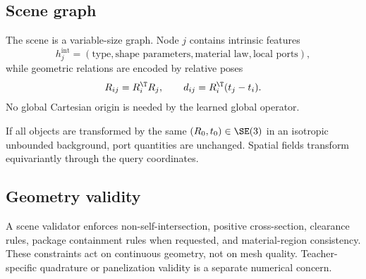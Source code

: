 \subsection{Scene graph}

The scene is a variable-size graph. Node $j$ contains intrinsic features
\[
  h_j^{\mathrm{int}}
  =
  (\text{type},\text{shape parameters},\text{material law},\text{local ports}),
\]
while geometric relations are encoded by relative poses
\[
  R_{ij}=R_i^\T R_j,\qquad
  d_{ij}=R_i^\T(t_j-t_i).
\]
No global Cartesian origin is needed by the learned global operator.

\begin{invariant}
If all objects are transformed by the same $(R_0,t_0)\in\SE(3)$ in an isotropic
unbounded background, port quantities are unchanged. Spatial fields transform
equivariantly through the query coordinates.
\end{invariant}

\subsection{Geometry validity}

A scene validator enforces non-self-intersection, positive cross-section,
clearance rules, package containment rules when requested, and material-region
consistency. These constraints act on continuous geometry, not on mesh quality.
Teacher-specific quadrature or panelization validity is a separate numerical
concern.
